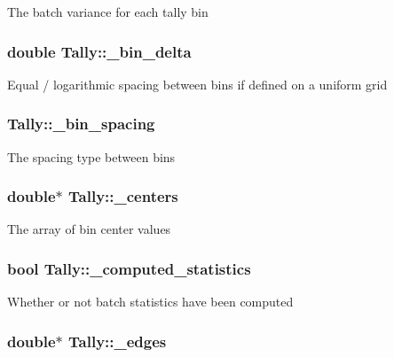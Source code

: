 The batch variance for each tally bin \hypertarget{classTally_ae86549476a8e7e485fe73dbb3b3be5b1}{
\subsubsection[{\-\_\-bin\-\_\-delta}]{\setlength{\rightskip}{0pt plus 5cm}double Tally\-::\-\_\-bin\-\_\-delta\hspace{0.3cm}{\ttfamily [protected]}}}\label{classTally_ae86549476a8e7e485fe73dbb3b3be5b1}
Equal / logarithmic spacing between bins if defined on a uniform grid \hypertarget{classTally_ac0dd7beca80d78fbbd9296bb3fcb0e5e}{
\subsubsection[{\-\_\-bin\-\_\-spacing}]{ Tally\-::\-\_\-bin\-\_\-spacing\hspace{0.3cm}{\ttfamily [protected]}}}\label{classTally_ac0dd7beca80d78fbbd9296bb3fcb0e5e}
The spacing type between bins \hypertarget{classTally_a7248cac93d9c10a52ad9ce02354b288d}{
\subsubsection[{\-\_\-centers}]{\setlength{\rightskip}{0pt plus 5cm}double$\ast$ Tally\-::\-\_\-centers\hspace{0.3cm}{\ttfamily [protected]}}}\label{classTally_a7248cac93d9c10a52ad9ce02354b288d}
The array of bin center values \hypertarget{classTally_a003383fc219cc3b964b19a1508fb2a7f}{
\subsubsection[{\-\_\-computed\-\_\-statistics}]{\setlength{\rightskip}{0pt plus 5cm}bool Tally\-::\-\_\-computed\-\_\-statistics\hspace{0.3cm}{\ttfamily [protected]}}}\label{classTally_a003383fc219cc3b964b19a1508fb2a7f}
Whether or not batch statistics have been computed \hypertarget{classTally_a2cd7b0c78c22b6ba926f55575a38723c}{
\subsubsection[{\-\_\-edges}]{\setlength{\rightskip}{0pt plus 5cm}double$\ast$ Tally\-::\-\_\-edges\hspace{0.3cm}{\ttfamily [protected]}}}\label{classTally_a2cd7b0c78c22b6ba926f55575a38723c}
